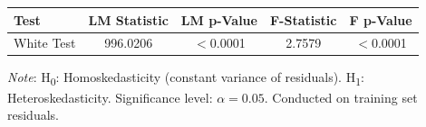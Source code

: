 \begin{tabular}{lcccc}
  \toprule
  \textbf{Test} & \textbf{LM Statistic} & \textbf{LM p-Value} & \textbf{F-Statistic} & \textbf{F p-Value} \\ 
  \midrule
  White Test & 996.0206 & $<$0.0001 & 2.7579 & $<$0.0001 \\ 
  \bottomrule
\end{tabular}
\par\vspace{4pt}
\begin{minipage}{\linewidth}
  \footnotesize \textit{Note}: H\textsubscript{0}: Homoskedasticity (constant variance of residuals). H\textsubscript{1}: Heteroskedasticity. Significance level: $\alpha = 0.05$. Conducted on training set residuals.
\end{minipage}